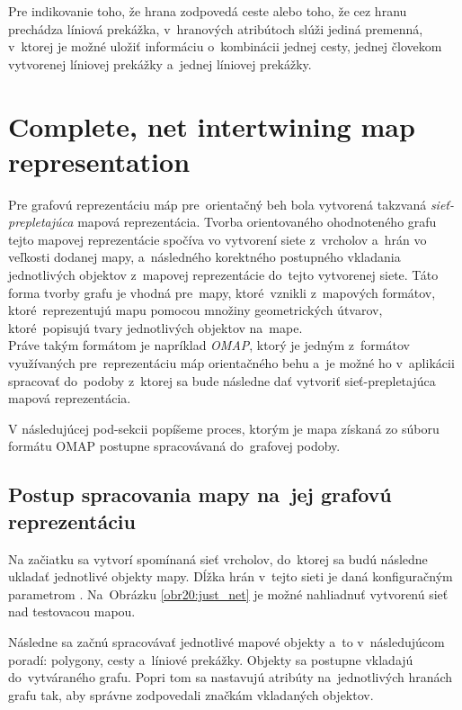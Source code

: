 Pre indikovanie toho, že hrana zodpovedá ceste alebo toho, že cez hranu prechádza líniová prekážka, v~hranových atribútoch slúži jediná premenná, v~ktorej je možné uložiť informáciu o~kombinácii jednej cesty, jednej človekom vytvorenej líniovej prekážky a~jednej  líniovej prekážky. 

\section{Complete, net intertwining map representation}

Pre grafovú reprezentáciu máp pre~orientačný beh bola vytvorená takzvaná \textit{sieť-prepletajúca} mapová reprezentácia. Tvorba orientovaného ohodnoteného grafu tejto mapovej reprezentácie spočíva vo vytvorení siete z~vrcholov a~hrán vo veľkosti dodanej mapy, a~následného korektného postupného vkladania jednotlivých objektov z~mapovej reprezentácie do~tejto vytvorenej siete. Táto forma tvorby grafu je vhodná pre~mapy, ktoré~vznikli z~mapových formátov, ktoré~reprezentujú mapu pomocou množiny geometrických útvarov, ktoré~popisujú tvary jednotlivých objektov na~mape.\\
Práve takým formátom je napríklad \textit{OMAP}, ktorý je jedným z~formátov využívaných pre~reprezentáciu máp orientačného behu a~je možné ho v~aplikácii spracovať do~podoby z~ktorej sa bude následne dať vytvoriť sieť-prepletajúca mapová reprezentácia. 

V následujúcej pod-sekcii popíšeme proces, ktorým je mapa  získaná zo súboru formátu OMAP postupne spracovávaná do~grafovej podoby.

\subsection{Postup spracovania mapy na~jej grafovú reprezentáciu}

Na začiatku sa vytvorí spomínaná sieť vrcholov, do~ktorej sa budú následne ukladať jednotlivé objekty mapy. Dĺžka hrán v~tejto sieti je daná konfiguračným parametrom . Na~Obrázku \ref{obr20:just_net} je možné nahliadnuť vytvorenú sieť nad testovacou mapou.

Následne sa začnú spracovávať jednotlivé mapové objekty a~to v~následujúcom poradí: polygony, cesty a~líniové prekážky.
Objekty sa postupne vkladajú do~vytváraného grafu. Popri tom sa nastavujú atribúty na~jednotlivých hranách grafu tak, aby správne zodpovedali značkám vkladaných objektov.

